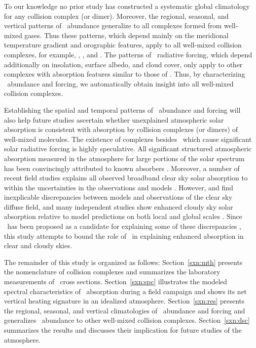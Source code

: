 \documentclass[agupp,twoside]{aguplus} %
\begin{document}
To our knowledge no prior study has constructed a systematic global
climatology for any collision complex (or dimer). 
Moreover, the regional, seasonal, and vertical patterns of \OdX\
abundance generalize to all complexes formed from well-mixed gases. 
Thus these patterns, which depend mainly on the meridional
temperature gradient and orographic features, apply to all
well-mixed collision complexes, for example, \NdNd, \OdAr, and \OdCOd.   
The patterns of \OdX\ radiative forcing, which depend additionally on 
insolation, surface albedo, and cloud cover, only apply to other
complexes with absorption features similar to those of \OdX.    
Thus, by characterizing \OdX\ abundance and forcing, we automatically 
obtain insight into all well-mixed collision complexes.

Establishing the spatial and temporal patterns of \OdX\ abundance and
forcing will also help future studies ascertain whether unexplained
atmospheric solar absorption is consistent with absorption by
collision complexes (or dimers) of well-mixed molecules. 
The existence of complexes besides \OdX\ which cause significant
solar radiative forcing is highly speculative.
All significant structured atmospheric absorption measured in the
atmosphere for large portions of the solar spectrum has been
convincingly attributed to known absorbers
\cite[]{PEP97,SPS98,MCB98,VRC981}.   
Moreover, a number of recent field studies explains all observed
broadband clear sky solar absorption to within the uncertainties in
the observations and models \cite[]{CRV97,ZBP97,RaV97,JiC98}.  
However, \cite{KAC97} and \cite{HNS98} find inexplicable discrepancies
between models and observations of the clear sky diffuse field, and  
many independent studies show enhanced cloudy sky solar absorption
relative to model predictions on both local and global scales
\cite[]{CZM95,ZBP97,Col98}.  
Since \OdX\ has been proposed as a candidate for explaining some of
these discrepancies \cite[]{EPP95,MGL97}, this study attempts to bound
the role of \OdX\ in explaining enhanced absorption in clear and
cloudy skies. 

The remainder of this study is organized as follows:
Section~\ref{sxn:mth} presents the nomenclature of collision complexes
and summarizes the laboratory measurements of \OdX\ cross sections.
Section~\ref{sxn:spc} illustrates the modeled spectral characteristics 
of \OdX\ absorption during a field campaign and shows its net vertical
heating signature in an idealized atmosphere.
Section~\ref{sxn:res} presents the regional, seasonal, and vertical
climatologies of \OdX\ abundance and forcing and generalizes \OdX\
abundance to other well-mixed collision complexes.
Section~\ref{sxn:dsc} summarizes the results and discusses their
implication for future studies of the atmosphere. 
\end{document}
